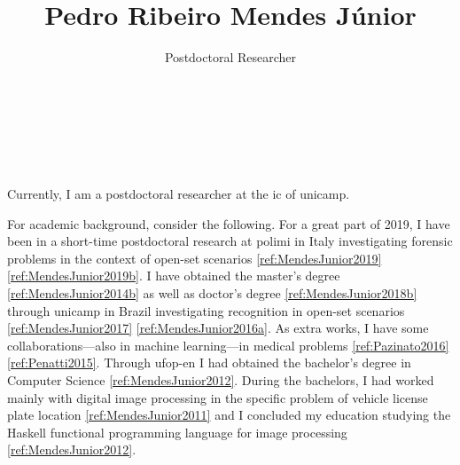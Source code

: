 

\title{Pedro Ribeiro Mendes Júnior}

\author{Postdoctoral Researcher\\%
  \\%
  \\%
  \\%
  \\%
}
\date{}



\maketitle

Currently, I am a postdoctoral researcher at the \gls{ic} of \gls{unicamp}.

For academic background, consider the following.
For a great part of 2019, I have been in a short-time postdoctoral research at \gls{polimi} in Italy investigating forensic problems in the context of open-set scenarios \ref{ref:MendesJunior2019} \ref{ref:MendesJunior2019b}.
I have obtained the master's degree \ref{ref:MendesJunior2014b} as well as doctor's degree \ref{ref:MendesJunior2018b} through \gls{unicamp} in Brazil investigating recognition in open-set scenarios \ref{ref:MendesJunior2017} \ref{ref:MendesJunior2016a}.
As extra works, I have some collaborations---also in machine learning---in medical problems \ref{ref:Pazinato2016} \ref{ref:Penatti2015}.
Through \gls{ufop-en} I had obtained the bachelor's degree in Computer Science \ref{ref:MendesJunior2012}.
During the bachelors, I had worked mainly with digital image processing in the specific problem of vehicle license plate location \ref{ref:MendesJunior2011} and I concluded my education studying the Haskell functional programming language for image processing \ref{ref:MendesJunior2012}.

